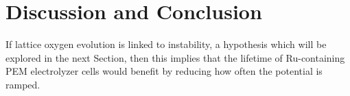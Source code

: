 \section{ Discussion and Conclusion}

If lattice oxygen evolution is linked to instability, a hypothesis which will be explored in the next Section, then this implies that the lifetime of Ru-containing PEM electrolyzer cells would benefit by reducing how often the potential is ramped.
